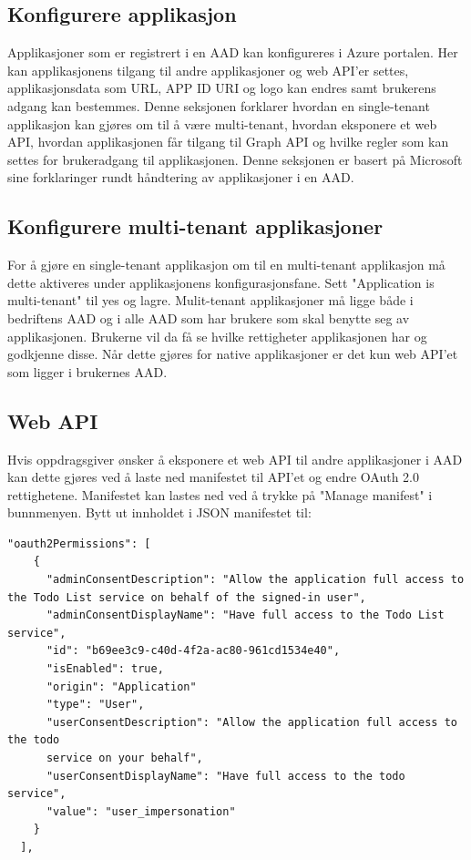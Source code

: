 \subsection{Konfigurere applikasjon}
\label{subsec:konfigurasjon_handteringAvApplikasjoner_konfigurereApplikasjonIAzureAD}
Applikasjoner som er registrert i en AAD kan konfigureres i Azure portalen. Her kan applikasjonens tilgang til andre applikasjoner og web API'er settes, applikasjonsdata som URL, APP ID URI og logo kan endres samt brukerens adgang kan bestemmes. Denne seksjonen forklarer hvordan en single-tenant applikasjon kan gjøres om til å være multi-tenant, hvordan eksponere et web API, hvordan applikasjonen får tilgang til Graph API og hvilke regler som kan settes for brukeradgang til applikasjonen. Denne seksjonen er basert på Microsoft sine forklaringer rundt håndtering av applikasjoner i en AAD. \cite{AddingUpdatingRemovingApplications}

\subsection*{Konfigurere multi-tenant applikasjoner}
For å gjøre en single-tenant applikasjon om til en multi-tenant applikasjon må dette aktiveres under applikasjonens konfigurasjonsfane. Sett "Application is multi-tenant" til yes og lagre. Mulit-tenant applikasjoner må ligge både i bedriftens AAD og i alle AAD som har brukere som skal benytte seg av applikasjonen. Brukerne vil da få se hvilke rettigheter applikasjonen har og godkjenne disse. Når dette gjøres for native applikasjoner er det kun web API'et som ligger i brukernes AAD. 

\subsection*{Web API}
Hvis oppdragsgiver ønsker å eksponere et web API til andre applikasjoner i AAD kan dette gjøres ved å laste ned manifestet til API'et og endre OAuth 2.0 rettighetene. Manifestet kan lastes ned ved å trykke på "Manage manifest" i bunnmenyen. Bytt ut innholdet i JSON manifestet til:

\begin{lstlisting}[caption={JSON manifest},label={lst:JSON_manifest}]
   "oauth2Permissions": [
    {
      "adminConsentDescription": "Allow the application full access to the Todo List service on behalf of the signed-in user",
      "adminConsentDisplayName": "Have full access to the Todo List service",
      "id": "b69ee3c9-c40d-4f2a-ac80-961cd1534e40",
      "isEnabled": true,
      "origin": "Application"
      "type": "User",
      "userConsentDescription": "Allow the application full access to the todo 
      service on your behalf",
      "userConsentDisplayName": "Have full access to the todo service",
      "value": "user_impersonation"
    }
  ],
\end{lstlisting}

